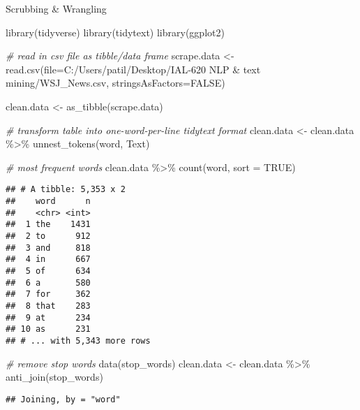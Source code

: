 \documentclass[
]{article}
\newenvironment{Shaded}{\begin{snugshade}}{\end{snugshade}}
\newcommand{\AttributeTok}[1]{\textcolor[rgb]{0.77,0.63,0.00}{#1}}
\newcommand{\CommentTok}[1]{\textcolor[rgb]{0.56,0.35,0.01}{\textit{#1}}}
\newcommand{\ConstantTok}[1]{\textcolor[rgb]{0.00,0.00,0.00}{#1}}
\newcommand{\FunctionTok}[1]{\textcolor[rgb]{0.00,0.00,0.00}{#1}}
\newcommand{\NormalTok}[1]{#1}
\newcommand{\OtherTok}[1]{\textcolor[rgb]{0.56,0.35,0.01}{#1}}
\newcommand{\SpecialCharTok}[1]{\textcolor[rgb]{0.00,0.00,0.00}{#1}}
\newcommand{\StringTok}[1]{\textcolor[rgb]{0.31,0.60,0.02}{#1}}
\begin{document}
Scrubbing \& Wrangling

\begin{Shaded}
\begin{Highlighting}[]
\FunctionTok{library}\NormalTok{(tidyverse)}
\FunctionTok{library}\NormalTok{(tidytext)}
\FunctionTok{library}\NormalTok{(ggplot2)}


\CommentTok{\# read in csv file as tibble/data frame}
\NormalTok{scrape.data }\OtherTok{\textless{}{-}} \FunctionTok{read.csv}\NormalTok{(}\AttributeTok{file=}\StringTok{\textquotesingle{}C:/Users/patil/Desktop/IAL{-}620 NLP \& text mining/WSJ\_News.csv\textquotesingle{}}\NormalTok{, }\AttributeTok{stringsAsFactors=}\ConstantTok{FALSE}\NormalTok{)}

\NormalTok{clean.data }\OtherTok{\textless{}{-}} \FunctionTok{as\_tibble}\NormalTok{(scrape.data)}



\CommentTok{\# transform table into one{-}word{-}per{-}line tidytext format}
\NormalTok{clean.data }\OtherTok{\textless{}{-}}\NormalTok{ clean.data }\SpecialCharTok{\%\textgreater{}\%}
  \FunctionTok{unnest\_tokens}\NormalTok{(word, Text)}

\CommentTok{\# most frequent words}
\NormalTok{clean.data }\SpecialCharTok{\%\textgreater{}\%}
  \FunctionTok{count}\NormalTok{(word, }\AttributeTok{sort =} \ConstantTok{TRUE}\NormalTok{)}
\end{Highlighting}
\end{Shaded}

\begin{verbatim}
## # A tibble: 5,353 x 2
##    word      n
##    <chr> <int>
##  1 the    1431
##  2 to      912
##  3 and     818
##  4 in      667
##  5 of      634
##  6 a       580
##  7 for     362
##  8 that    283
##  9 at      234
## 10 as      231
## # ... with 5,343 more rows
\end{verbatim}

\begin{Shaded}
\begin{Highlighting}[]
\CommentTok{\# remove stop words}
\FunctionTok{data}\NormalTok{(stop\_words)}
\NormalTok{clean.data }\OtherTok{\textless{}{-}}\NormalTok{ clean.data }\SpecialCharTok{\%\textgreater{}\%}
  \FunctionTok{anti\_join}\NormalTok{(stop\_words)}
\end{Highlighting}
\end{Shaded}

\begin{verbatim}
## Joining, by = "word"
\end{verbatim}
\end{document}
